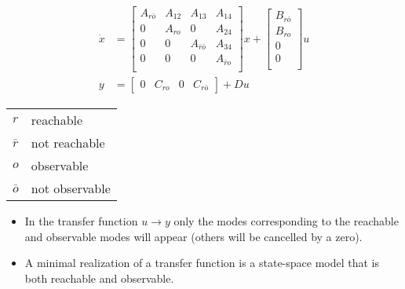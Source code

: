 \begin{align*}
    \dot{x} & = \begin{bmatrix}
                    A_{r\bar{o}} & A_{12} & A_{13}             & A_{14}       \\
                    0            & A_{ro} & 0                  & A_{24}       \\
                    0            & 0      & A_{\bar{r}\bar{o}} & A_{34}       \\
                    0            & 0      & 0                  & A_{\bar{r}o} \\
                \end{bmatrix}
    x + \begin{bmatrix}
            B_{r\bar{o}} \\
            B_{ro}       \\
            0            \\
            0            \\
        \end{bmatrix}
    u                                                                                                   \\
    y       & = \begin{bmatrix}
                    0 & C_{ro} & 0 & C_{r\bar{o}}
                \end{bmatrix}
    + Du
\end{align*}

\newpar{}

\begin{tabularx}{\linewidth}{@{}ll@{}}
    $r$       & reachable      \\
    $\bar{r}$ & not reachable  \\
    $o$       & observable     \\
    $\bar{o}$ & not observable \\
\end{tabularx}

\begin{itemize}
    \item In the transfer function $u \rightarrow y$ only the modes corresponding to the reachable and observable modes will appear (others will be cancelled by a zero).
    \item A minimal realization of a transfer function is a state-space model that is both reachable and observable.
\end{itemize}